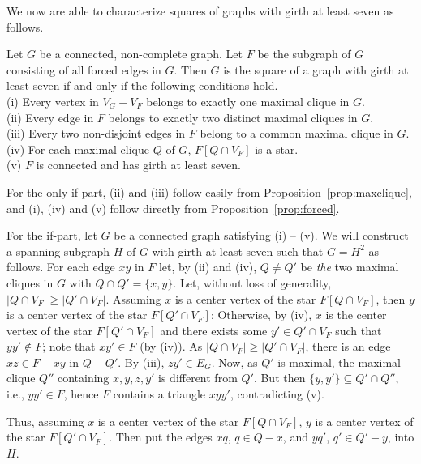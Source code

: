 \documentclass[proceedings]{stacs}
\newlength{\ai}
\begin{document}
We now are able to characterize squares of graphs with girth at least seven as follows.
\begin{theorem}\label{thm:girthseven}
Let $G$ be a connected, non-complete graph. Let $F$ be the subgraph of $G$ consisting of all forced
edges in $G$. Then $G$ is the square of a graph with girth at least seven if and only if the following
conditions hold.\\
(i)   Every vertex in $V_G-V_F$ belongs to exactly one maximal clique in $G$. \\
(ii)  Every edge in $F$ belongs to exactly two distinct maximal cliques in $G$.\\
(iii) Every two non-disjoint edges in $F$ belong to a common maximal clique in $G$.\\
(iv)  For each maximal clique $Q$ of $G$, $F[Q\cap V_F]$ is a star.\\
(v)   $F$ is connected and has girth at least seven.
\end{theorem}
\proof For the only if-part, (ii) and (iii) follow easily from Proposition~\ref{prop:maxclique},
and (i), (iv) and (v) follow directly from Proposition~\ref{prop:forced}.

For the if-part, let $G$ be a connected graph satisfying (i) -- (v). We will construct a spanning
subgraph $H$ of $G$ with girth at least seven such that $G=H^2$ as follows. For each edge $xy$ in
$F$ let, by (ii) and (iv), $Q\not= Q'$ be \emph{the} two maximal cliques in $G$ with $Q\cap Q'=\{x,y\}$.
Let, without loss of generality, $|Q\cap V_F|\ge |Q'\cap V_F|$.
Assuming $x$ is a center vertex of the star $F[Q\cap V_F]$, then $y$ is a center vertex of the star $F[Q'\cap V_F]$:
Otherwise, by (iv), $x$ is the center vertex of the star $F[Q'\cap V_F]$ and
  there exists some $y'\in Q'\cap V_F$ such that $yy'\not\in F$; note that $xy'\in F$ (by (iv)).
As $|Q\cap V_F|\ge |Q'\cap V_F|$, there is an edge $xz\in F-xy$ in $Q-Q'$. By (iii), $zy'\in E_G$.
Now, as $Q'$ is maximal, the maximal clique $Q''$ containing $x, y, z, y'$ is different from $Q'$.
But then $\{y,y'\}\subseteq Q'\cap Q''$, i.e., $yy'\in F$, hence $F$ contains a triangle $xyy'$,
contradicting (v).

Thus, assuming $x$ is a center vertex of the star $F[Q\cap V_F]$, $y$ is a center vertex of the
star $F[Q'\cap V_F]$. Then put the edges $xq$, $q\in Q-x$, and $yq'$, $q'\in Q'-y$, into $H$.
\end{document}
